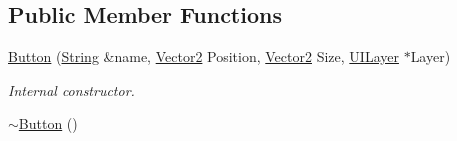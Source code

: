 \subsection*{Public Member Functions}
\begin{DoxyCompactItemize}
\item 
\hyperlink{classphys_1_1UI_1_1Button_a0e5b7c9c581e3e90eb1e86b302dd6854}{Button} (\hyperlink{namespacephys_aa03900411993de7fbfec4789bc1d392e}{String} \&name, \hyperlink{classphys_1_1Vector2}{Vector2} Position, \hyperlink{classphys_1_1Vector2}{Vector2} Size, \hyperlink{classphys_1_1UILayer}{UILayer} $\ast$Layer)
\begin{DoxyCompactList}\small\item\em Internal constructor. \item\end{DoxyCompactList}\item 
\hypertarget{classphys_1_1UI_1_1Button_a80c8c92ae289e3161dde94bf1a5de59e}{
\hyperlink{classphys_1_1UI_1_1Button_a80c8c92ae289e3161dde94bf1a5de59e}{$\sim$Button} ()}
\label{d8/d88/classphys_1_1UI_1_1Button_a80c8c92ae289e3161dde94bf1a5de59e}


\end{DoxyCompactItemize}
